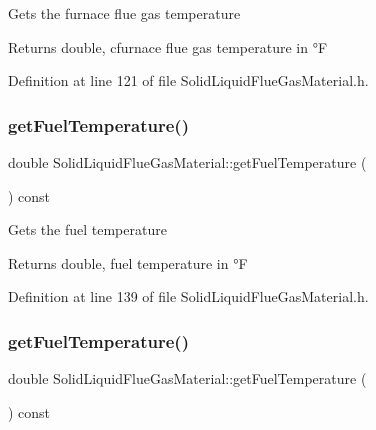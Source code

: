 Gets the furnace flue gas temperature \begin{DoxyReturn}{Returns}
double, cfurnace flue gas temperature in °F 
\end{DoxyReturn}


Definition at line 121 of file Solid\+Liquid\+Flue\+Gas\+Material.\+h.

\mbox{\label{class_solid_liquid_flue_gas_material_a629ecc7104b6bfbb696d9478c4b48e7a}} 
\subsubsection{\texorpdfstring{get\+Fuel\+Temperature()}{getFuelTemperature()}\hspace{0.1cm}{\footnotesize\ttfamily [1/3]}}
{\footnotesize\ttfamily double Solid\+Liquid\+Flue\+Gas\+Material\+::get\+Fuel\+Temperature (\begin{DoxyParamCaption}{ }\end{DoxyParamCaption}) const\hspace{0.3cm}{\ttfamily [inline]}}

Gets the fuel temperature \begin{DoxyReturn}{Returns}
double, fuel temperature in °F 
\end{DoxyReturn}


Definition at line 139 of file Solid\+Liquid\+Flue\+Gas\+Material.\+h.

\mbox{\label{class_solid_liquid_flue_gas_material_a629ecc7104b6bfbb696d9478c4b48e7a}} 
\subsubsection{\texorpdfstring{get\+Fuel\+Temperature()}{getFuelTemperature()}\hspace{0.1cm}{\footnotesize\ttfamily [2/3]}}
{\footnotesize\ttfamily double Solid\+Liquid\+Flue\+Gas\+Material\+::get\+Fuel\+Temperature (\begin{DoxyParamCaption}{ }\end{DoxyParamCaption}) const\hspace{0.3cm}{\ttfamily [inline]}}

